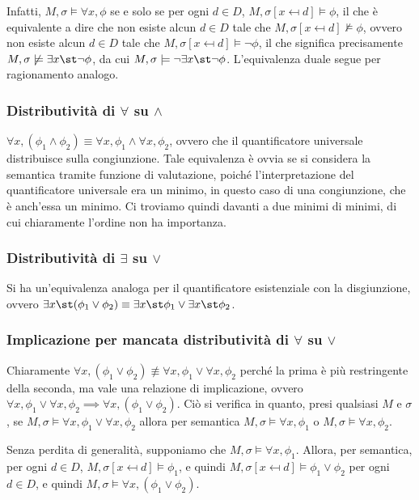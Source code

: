 Infatti, \(M,\sigma\models \forall x,\phi\) se e solo se per ogni \(d\in D\), \(M,\sigma[x\mapsfrom d]\models \phi\), il che è equivalente a dire che non esiste alcun \(d\in D\) tale che \(M,\sigma[x\mapsfrom d]\not\models \phi\), ovvero non esiste alcun \(d\in D\) tale che \(M,\sigma[x\mapsfrom d]\models \neg \phi\), il che significa precisamente \(M,\sigma\not\models \exists x\st \neg \phi\), da cui \(M,\sigma\models \neg \exists x\st \neg \phi\). L'equivalenza duale segue per ragionamento analogo.

\subsubsection{Distributività di \(\forall\) su \(\land\)}
\(\forall x, (\phi_1 \land \phi_2) \equiv \forall x, \phi_1 \land \forall x, \phi_2\), ovvero che il quantificatore universale distribuisce sulla congiunzione. Tale equivalenza è ovvia se si considera la semantica tramite funzione di valutazione, poiché l'interpretazione del quantificatore universale era un minimo, in questo caso di una congiunzione, che è anch'essa un minimo. Ci troviamo quindi davanti a due minimi di minimi, di cui chiaramente l'ordine non ha importanza. 

\subsubsection{Distributività di \(\exists\) su \(\lor\)}
Si ha un'equivalenza analoga per il quantificatore esistenziale con la disgiunzione, ovvero \(\exists x\st (\phi_1 \lor \phi_2) \equiv \exists x\st \phi_1 \lor \exists x\st \phi_2\).

\subsubsection{Implicazione per mancata distributività di \(\forall\) su \(\lor\)}
Chiaramente \(\forall x, (\phi_1 \lor \phi_2) \not\equiv \forall x, \phi_1 \lor \forall x, \phi_2\) perché la prima è più restringente della seconda, ma vale una relazione di implicazione, ovvero \(\forall x,\phi_1 \lor \forall x, \phi_2 \implies \forall x, (\phi_1 \lor \phi_2)\). Ciò si verifica in quanto, presi qualsiasi \(M\) e \(\sigma\), se \(M,\sigma\models\forall x,\phi_1 \lor \forall x, \phi_2\) allora per semantica \(M,\sigma\models \forall x,\phi_1\) o \(M,\sigma\models\forall x, \phi_2\). 

Senza perdita di generalità, supponiamo che \(M,\sigma\models\forall x,\phi_1\). Allora, per semantica, per ogni \(d\in D\), \(M,\sigma[x\mapsfrom d]\models \phi_1\), e quindi \(M,\sigma[x\mapsfrom d]\models \phi_1 \lor \phi_2\) per ogni \(d\in D\), e quindi \(M,\sigma\models \forall x, (\phi_1 \lor \phi_2)\). 

